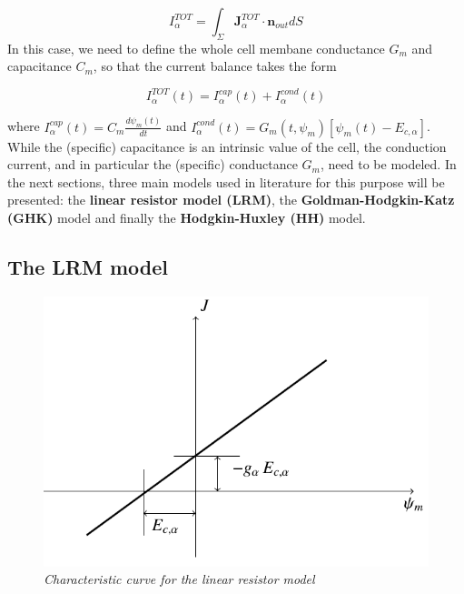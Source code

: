 \documentclass[12pt, a4paper]{article}
\begin{document}
\begin{equation}
I_{\alpha}^{TOT} = \int_{\Sigma} \textbf{J}_{\alpha}^{TOT} \cdot \textbf{n}_{out} dS 
\end{equation} 
In this case, we need to define the whole cell membane conductance $ G_m$ and capacitance $ C_m $, so that the current balance takes the form

\begin{equation}
I_{\alpha}^{TOT}(t) = I_{\alpha}^{cap}(t) + I_{\alpha}^{cond}(t)
\end{equation}

where $  I_{\alpha}^{cap}(t) = C_m \frac{d \psi_m(t)}{d t}$ and $ I_{\alpha}^{cond}(t) = G_m(t,\psi_m) [\psi_m(t) - E_{c,\alpha}]$.\\
While the (specific) capacitance is an intrinsic value of the cell, the conduction current, and  in particular the (specific) conductance $G_m$, need to be modeled. In the next sections, three main models used in literature for this purpose will be presented: the \textbf{linear resistor model (LRM)}, the \textbf{Goldman-Hodgkin-Katz (GHK)} model and finally the \textbf{Hodgkin-Huxley (HH)} model.\\




\subsection{The LRM model}

\begin{figure}[H]
	\begin{center}
		\includegraphics[scale=0.77]{LRM.png} 
	\end{center} 
	\caption{\textit{Characteristic curve for the linear resistor model}} \label{LRM}
	
\end{figure}
\end{document}
